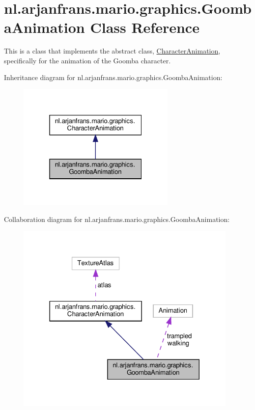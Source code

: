 \hypertarget{classnl_1_1arjanfrans_1_1mario_1_1graphics_1_1GoombaAnimation}{}\section{nl.\+arjanfrans.\+mario.\+graphics.\+Goomba\+Animation Class Reference}
\label{classnl_1_1arjanfrans_1_1mario_1_1graphics_1_1GoombaAnimation}


This is a class that implements the abstract class, \hyperlink{classnl_1_1arjanfrans_1_1mario_1_1graphics_1_1CharacterAnimation}{Character\+Animation}, specifically for the animation of the Goomba character.  




Inheritance diagram for nl.\+arjanfrans.\+mario.\+graphics.\+Goomba\+Animation\+:
\nopagebreak
\begin{figure}[H]
\begin{center}
\leavevmode
\includegraphics[width=220pt]{classnl_1_1arjanfrans_1_1mario_1_1graphics_1_1GoombaAnimation__inherit__graph}
\end{center}
\end{figure}


Collaboration diagram for nl.\+arjanfrans.\+mario.\+graphics.\+Goomba\+Animation\+:
\nopagebreak
\begin{figure}[H]
\begin{center}
\leavevmode
\includegraphics[width=308pt]{classnl_1_1arjanfrans_1_1mario_1_1graphics_1_1GoombaAnimation__coll__graph}
\end{center}
\end{figure}
